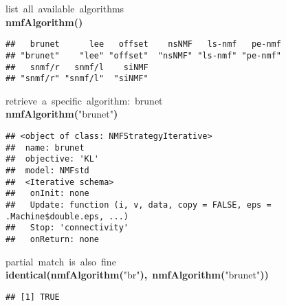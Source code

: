 \documentclass[a4paper]{article}\usepackage{graphicx, color}
\makeatletter
\newcommand{\hlfunctioncall}[1]{\textcolor[rgb]{0.501960784313725,0,0.329411764705882}{\textbf{#1}}}%
\newcommand{\hlstring}[1]{\textcolor[rgb]{0.6,0.6,1}{#1}}%
\newcommand{\hlkeyword}[1]{\textcolor[rgb]{0,0,0}{\textbf{#1}}}%
\newcommand{\hlcomment}[1]{\textcolor[rgb]{0.180392156862745,0.6,0.341176470588235}{#1}}%
\newcommand{\hlstd}[1]{\textcolor[rgb]{0,0,0}{#1}}%
\newenvironment{kframe}{%
 \def\FrameCommand##1{\hskip\@totalleftmargin \hskip-\fboxsep
 \colorbox{shadecolor}{##1}\hskip-\fboxsep
     \hskip-\linewidth \hskip-\@totalleftmargin \hskip\columnwidth}%
 \MakeFramed {\advance\hsize-\width
   \@totalleftmargin\z@ \linewidth\hsize
   \@setminipage}}%
 {\par\unskip\endMakeFramed}
\newenvironment{knitrout}{}{} %
\makeatother
\begin{document}
\begin{knitrout}
\color{fgcolor}\begin{kframe}
\begin{flushleft}
\ttfamily\noindent
\hlcomment{\usebox{\hlnormalsizeboxhash}{\ }list{\ }all{\ }available{\ }algorithms}\hspace*{\fill}\\
\hlstd{}\hlfunctioncall{nmfAlgorithm}\hlkeyword{(}\hlkeyword{)}\mbox{}
\normalfont
\end{flushleft}
\begin{verbatim}
##   brunet      lee   offset    nsNMF   ls-nmf   pe-nmf 
## "brunet"    "lee" "offset"  "nsNMF" "ls-nmf" "pe-nmf" 
##   snmf/r   snmf/l    siNMF 
## "snmf/r" "snmf/l"  "siNMF" 
\end{verbatim}
\begin{flushleft}
\ttfamily\noindent
\hlcomment{\usebox{\hlnormalsizeboxhash}{\ }retrieve{\ }a{\ }specific{\ }algorithm:{\ }\usebox{\hlnormalsizeboxsinglequote}brunet\usebox{\hlnormalsizeboxsinglequote}}\hspace*{\fill}\\
\hlstd{}\hlfunctioncall{nmfAlgorithm}\hlkeyword{(}\hlstring{"{}brunet"{}}\hlkeyword{)}\mbox{}
\normalfont
\end{flushleft}
\begin{verbatim}
## <object of class: NMFStrategyIterative>
##  name: brunet 
##  objective: 'KL' 
##  model: NMFstd 
##  <Iterative schema>
##   onInit: none
##   Update: function (i, v, data, copy = FALSE, eps = .Machine$double.eps, ...)
##   Stop: 'connectivity'
##   onReturn: none
\end{verbatim}
\begin{flushleft}
\ttfamily\noindent
\hlcomment{\usebox{\hlnormalsizeboxhash}{\ }partial{\ }match{\ }is{\ }also{\ }fine}\hspace*{\fill}\\
\hlstd{}\hlfunctioncall{identical}\hlkeyword{(}\hlfunctioncall{nmfAlgorithm}\hlkeyword{(}\hlstring{"{}br"{}}\hlkeyword{)}\hlkeyword{,}{\ }\hlfunctioncall{nmfAlgorithm}\hlkeyword{(}\hlstring{"{}brunet"{}}\hlkeyword{)}\hlkeyword{)}\mbox{}
\normalfont
\end{flushleft}
\begin{verbatim}
## [1] TRUE
\end{verbatim}
\end{kframe}
\end{knitrout}
\end{document}
